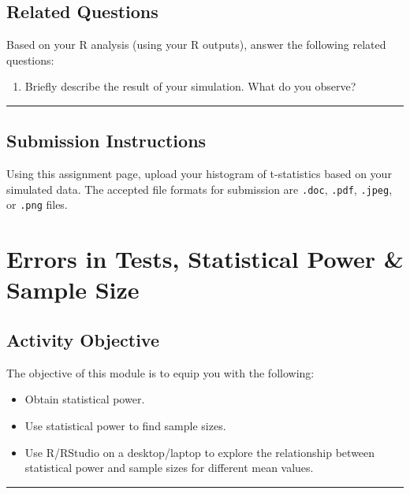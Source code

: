 \documentclass[oneside,openany]{book}
\providecommand{\tightlist}{%
  \setlength{\itemsep}{0pt}\setlength{\parskip}{0pt}}
\begin{document}
\section{Related Questions}\label{related-questions-5}

Based on your R analysis (using your R outputs), answer the following related questions:

\begin{enumerate}
\def\labelenumi{\arabic{enumi}.}
\tightlist
\item
  Briefly describe the result of your simulation. What do you observe?
\end{enumerate}

\begin{center}\rule{0.5\linewidth}{0.5pt}\end{center}

\section{Submission Instructions}\label{submission-instructions}

Using this assignment page, upload your histogram of t-statistics based on your simulated data. The accepted file formats for  submission are \texttt{.doc}, \texttt{.pdf}, \texttt{.jpeg}, or \texttt{.png} files.

\chapter{Errors in Tests, Statistical Power \& Sample Size}\label{activity-7---errors-in-tests-statistical-power-sample-size}

\section{Activity Objective}\label{activity-objective-4}

The objective of this module is to equip you with the following:

\begin{itemize}
    \item Obtain statistical power.
    \item Use statistical power to find sample sizes.
    \item Use R/RStudio on a desktop/laptop to explore the relationship between statistical power and sample sizes for different mean values.
\end{itemize}


\begin{center}\rule{0.5\linewidth}{0.5pt}\end{center}
\end{document}
